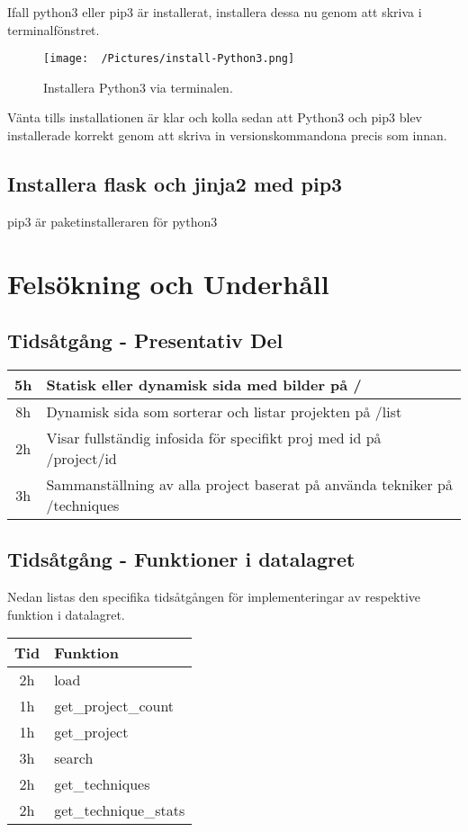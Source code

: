 \documentclass{TDP003mall}
\begin{document}
Ifall python3 eller pip3  är installerat, installera dessa nu genom att skriva  i terminalfönstret.
\begin{figure}[htbp]
  \centerline{\texttt{[image: ~/Pictures/install-Python3.png]}}
  \caption{Installera Python3 via terminalen.}
  \label{fig}
\end{figure}
Vänta tills installationen är klar och kolla sedan att Python3 och pip3 blev installerade korrekt genom att skriva in versionskommandona precis som innan.

\subsection{Installera flask och jinja2 med pip3}
pip3 är paketinstalleraren för python3



\section{Felsökning och Underhåll}


\subsection{Tidsåtgång - Presentativ Del}
\begin{tabular}{|c|l|}
  \hline
  5h & Statisk eller dynamisk sida med bilder på /\\
  \hline
  8h & Dynamisk sida som sorterar och listar projekten på /list\\
  \hline
  2h & Visar fullständig infosida för specifikt proj med id på /project/id\\
  \hline
  3h & Sammanställning av alla project baserat på använda tekniker på /techniques\\
  \hline
\end{tabular}

\subsection{Tidsåtgång - Funktioner i datalagret}
Nedan listas den specifika tidsåtgången för implementeringar av respektive funktion i datalagret.

\begin{tabular}{|c|l|}
  \hline
  Tid & Funktion\\
  \hline
  2h & load\\
  \hline
  1h & get\_project\_count\\
  \hline
  1h & get\_project\\
  \hline
  3h & search\\
  \hline
  2h & get\_techniques\\
  \hline
  2h & get\_technique\_stats\\
  \hline
\end{tabular}
\end{document}
